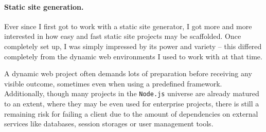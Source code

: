 \paragraph{Static site generation.}
Ever since I first got to work with a static site generator, I got more and more interested in how easy and fast static site projects may be scaffolded. Once completely set up, I was simply impressed by its power and variety -- this differed completely from the dynamic web environments I used to work with at that time.

A dynamic web project often demands lots of preparation before receiving any visible outcome, sometimes even when using a predefined framework. Additionally, though many projects in the \texttt{Node.js} universe are already matured to an extent, where they may be even used for enterprise projects, there is still a remaining risk for failing a client due to the amount of dependencies on external services like databases, session storages or user management tools.




